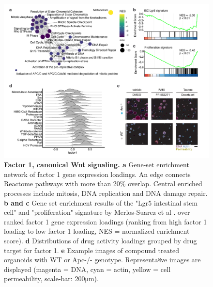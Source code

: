 \begin{flushleft}
\begin{figure}[h!]
\centering
\includegraphics[width=\textwidth,
                height=\textheight,
                keepaspectratio]{figures/adenomaprofiling/pdf/fig_2_1.pdf}
\caption{\textbf{Factor 1, canonical Wnt signaling. a} Gene-set enrichment network of factor 1 gene expression loadings. An edge connects Reactome pathways with more than 20\% overlap. Central enriched processes include mitosis, DNA replication and DNA damage repair. \textbf{b and c} Gene set enrichment results of the "Lgr5 intestinal stem cell" and "proliferation" signature by Merlos-Suarez et al \cite{Merlos-Suarez2011-gd}. over ranked factor 1 gene expression loadings (ranking from high factor 1 loading to low factor 1 loading, NES = normalized enrichment score). \textbf{d} Distributions of drug activity loadings grouped by drug target for factor 1. \textbf{e} Example images of compound treated organoids with WT or Apc-/- genotype. Representaধve images are displayed (magenta = DNA, cyan = actin, yellow = cell permeability, scale-bar: 200μm).}
\label{fig_190}
\end{figure}
\bigbreak


\end{flushleft}
